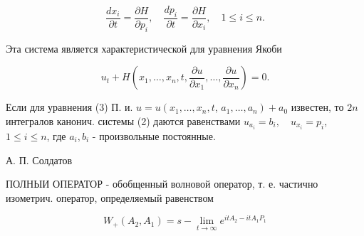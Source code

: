 \documentclass[10pt]{article}
\begin{document}
\[

\frac{d x_{i}}{\partial t}=\frac{\partial H}{\partial p_{i}}, \quad \frac{d p_{i}}{\partial t}=\frac{\partial H}{\partial x_{i}}, \quad 1 \leqslant i \leqslant n .

\]



Эта система является характеристической для уравнения Якоби



\[

u_{t}+H\left(x_{1}, \ldots, x_{n}, t, \frac{\partial u}{\partial x_{1}}, \ldots, \frac{\partial u}{\partial x_{n}}\right)=0 .

\]



Если для уравнения (3) П. и. $u=u\left(x_{1}, \ldots, x_{n}, t\right.$, $\left.a_{1}, \ldots, a_{n}\right)+a_{0}$ известен, то $2 n$ интегралов канонич. системы (2) даются равенствами $u_{a_{i}}=b_{i}, \quad u_{x_{i}}=p_{i}$, $1 \leqslant i \leqslant n$, где $a_{i}, b_{i}$ - произвольные постоянные.



А. П. Солдатов



ПОЛНЫИ ОПЕРАТОР - обобщенный волновой оператор, т. е. частично изометрич. оператор, определяемый равенством



\[

W_{+}\left(A_{2}, A_{1}\right)=s-\lim _{t \rightarrow \infty} e^{i t A_{2}-i t A_{1} P_{1}}

\]
\end{document}
